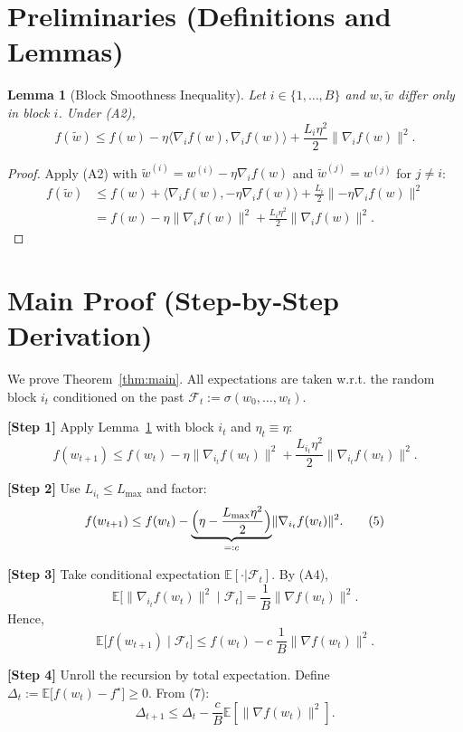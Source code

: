 \documentclass{article}
\newtheorem{lemma}{Lemma}
\newcommand{\E}{\mathbb{E}}
\newcommand{\norm}[1]{\lVert #1\rVert}
\begin{document}
\newpage

\section*{Preliminaries (Definitions and Lemmas)}
\begin{lemma}[Block Smoothness Inequality]\label{lem:smooth}
Let $i\in\{1,\dots ,B\}$ and $w,\tilde w$ differ only in block $i$.  Under (A2),
\[
f(\tilde w) \le f(w) - \eta\langle \nabla_i f(w),\nabla_i f(w)\rangle
          + \frac{L_i\eta^{2}}{2}\norm{\nabla_i f(w)}^{2}.
\tag{3}
\]
\end{lemma}
\begin{proof}
Apply (A2) with $\tilde w^{(i)} = w^{(i)} - \eta \nabla_i f(w)$ and
$\tilde w^{(j)}=w^{(j)}$ for $j\neq i$:
\[
\begin{aligned}
f(\tilde w)
&\le f(w) + \big\langle \nabla_i f(w), -\eta \nabla_i f(w)\big\rangle
     +\frac{L_i}{2}\norm{-\eta\nabla_i f(w)}^{2}\\
&= f(w) - \eta \norm{\nabla_i f(w)}^{2}
   +\frac{L_i\eta^{2}}{2}\norm{\nabla_i f(w)}^{2}.
\end{aligned}
\]
\end{proof}

\section*{Main Proof (Step‑by‑Step Derivation)}
We prove Theorem~\ref{thm:main}.  All expectations are taken w.r.t. the
random block $i_t$ conditioned on the past $\mathcal{F}_t:=\sigma(w_0,\dots ,w_t)$.

\noindent\textbf{[Step 1]} Apply Lemma~\ref{lem:smooth} with block $i_t$ and
$\eta_t\equiv\eta$:
\[
f(w_{t+1}) \le f(w_t) -\eta \norm{\nabla_{i_t}f(w_t)}^{2}
                 +\frac{L_{i_t}\eta^{2}}{2}\norm{\nabla_{i_t}f(w_t)}^{2}.
\tag{4}
\]

\noindent\textbf{[Step 2]} Use $L_{i_t}\le L_{\max}$ and factor:
\[
f(w_{t+1}) \le f(w_t) -\underbrace{\Bigl(\eta-\frac{L_{\max}\eta^{2}}{2}\Bigr)}_{=:c}
               \norm{\nabla_{i_t}f(w_t)}^{2}.
\tag{5}
\]

\noindent\textbf{[Step 3]} Take conditional expectation $\E[\cdot|\mathcal{F}_t]$.
By (A4),
\[
\E\big[\norm{\nabla_{i_t}f(w_t)}^{2}\mid\mathcal{F}_t\big]
   =\frac{1}{B}\norm{\nabla f(w_t)}^{2}.
\tag{6}
\]
Hence,
\[
\E\big[f(w_{t+1})\mid\mathcal{F}_t\big]
   \le f(w_t) - c\;\frac{1}{B}\norm{\nabla f(w_t)}^{2}.
\tag{7}
\]

\noindent\textbf{[Step 4]} Unroll the recursion by total expectation.
Define $\Delta_t:=\E\big[f(w_t)-f^\star\big]\ge0$.  From (7):
\[
\Delta_{t+1}\le \Delta_t - \frac{c}{B}\E\!\left[\norm{\nabla f(w_t)}^{2}\right].
\tag{8}
\]
\end{document}
